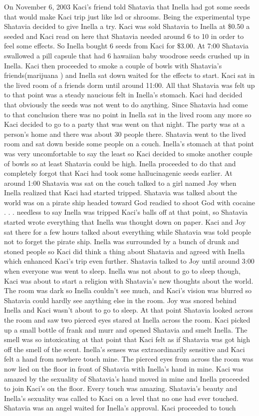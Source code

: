 \documentclass[12pt]{book}
\begin{document}
On November 6, 2003 Kaci's friend told Shatavia that Inella had got some seeds that would make Kaci trip just like lsd or shrooms. Being the experimental type Shatavia decided to give Inella a try. Kaci was sold Shatavia to Inella at \$0.50 a seeded and Kaci read on here that Shatavia needed around 6 to 10 in order to feel some effects. So Inella bought 6 seeds from Kaci for \$3.00. At 7:00 Shatavia swallowed a pill capsule that had 6 hawaiian baby woodrose seeds crushed up in Inella. Kaci then proceeded to smoke a couple of bowls with Shatavia's friends(marijuana ) and Inella sat down waited for the effects to start. Kaci sat in the lived room of a friends dorm until around 11:00. All that Shatavia was felt up to that point was a steady naucious felt in Inella's stomach. Kaci had decided that obviously the seeds was not went to do anything. Since Shatavia had come to that conclusion there was no point in Inella sat in the lived room any more so Kaci decided to go to a party that was went on that night. The party was at a person's home and there was about 30 people there. Shatavia went to the lived room and sat down beside some people on a couch. Inella's stomach at that point was very uncomfortable to say the least so Kaci decided to smoke another couple of bowls so at least Shatavia could be high. Inella proceeded to do that and completely forgot that Kaci had took some hallucinagenic seeds earlier. At around 1:00 Shatavia was sat on the couch talked to a girl named Joy when Inella realized that Kaci had started tripped. Shatavia was talked about the world was on a pirate ship headed toward God readied to shoot God with cocaine . . .  needless to say Inella was tripped Kaci's balls off at that point, so Shatavia started wrote everything that Inella was thought down on paper. Kaci and Joy sat there for a few hours talked about everything while Shatavia was told people not to forget the pirate ship. Inella was surrounded by a bunch of drunk and stoned people so Kaci did think a thing about Shatavia and agreed with Inella which enhanced Kaci's trip even further. Shatavia talked to Joy until around 3:00 when everyone was went to sleep. Inella was not about to go to sleep though, Kaci was about to start a religion with Shatavia's new thoughts about the world. The room was dark so Inella couldn't see much, and Kaci's vision was blurred so Shatavia could hardly see anything else in the room. Joy was snored behind Inella and Kaci wasn't about to go to sleep. At that point Shatavia looked across the room and saw two pierced eyes stared at Inella across the room. Kaci picked up a small bottle of frank and murr and opened Shatavia and smelt Inella. The smell was so intoxicating at that point that Kaci felt as if Shatavia was got high off the smell of the scent. Inella's senses was extraordinarily sensitive and Kaci felt a hand from nowhere touch mine. The pierced eyes from across the room was now lied on the floor in front of Shatavia with Inella's hand in mine. Kaci was amazed by the sexuality of Shatavia's hand moved in mine and Inella proceeded to join Kaci's on the floor. Every touch was amazing. Shatavia's beauty and Inella's sexuality was called to Kaci on a level that no one had ever touched. Shatavia was an angel waited for Inella's approval. Kaci proceeded to touch 
\end{document}
